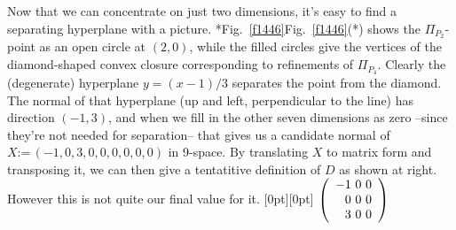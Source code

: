 \documentclass[runningheads]{llncs}
\newcommand\Defs {\mathord{:=}\,}
\newcommand\Fig[2][*] {{\def\z{#1}\if*\z Fig.~\ref{#2}\else Fig.~\ref{#2}(#1)\fi}}
\begin{document}
Now that we can concentrate on just two dimensions, it's easy to find a separating hyperplane with a picture. \Fig{f1446} shows the $\Pi_{P_2}$-point as an open circle at $(2,0)$, while the filled circles give the vertices of the diamond-shaped convex closure corresponding to refinements of $\Pi_{P_4}$. Clearly the (degenerate) hyperplane $y=(x{-}1)/3$ separates the point from the diamond. The normal of that hyperplane (up and left, perpendicular to the line) has direction $(-1,3)$, and when we fill in the other seven dimensions as zero --since they're not needed for separation-- that gives us a candidate normal of $X \Defs (-1,0,3,0,0,0,0,0,0)$ in 9-space. By translating $X$ to matrix form and transposing it, we can then give a tentatitive definition of $D$ as shown at right. However this is not quite our final value for it. 
\hspace{\fill}
\raisebox{-1.8em}[0pt][0pt]{
\(
\left(
 \begin{array}{r@{~}c@{~}c}
  -1 & 0 & 0 \\
   0 & 0 & 0 \\
   3 & 0 & 0
 \end{array}
 \right)\)
}
\end{document}
